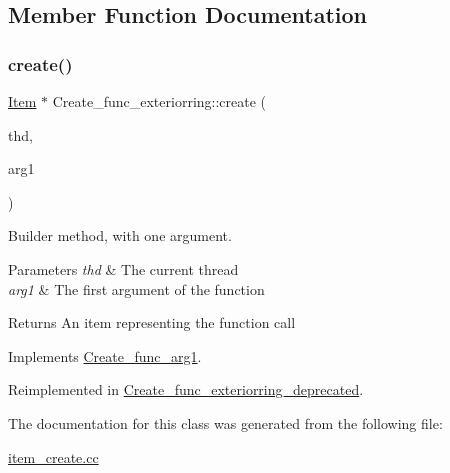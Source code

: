 \subsection{Member Function Documentation}
\mbox{\label{classCreate__func__exteriorring_a5c826151baad6fc0e554c5faacbc552a}} 
\subsubsection{\texorpdfstring{create()}{create()}}
{\footnotesize\ttfamily \mbox{\hyperlink{classItem}{Item}} $\ast$ Create\+\_\+func\+\_\+exteriorring\+::create (\begin{DoxyParamCaption}\item[{T\+HD $\ast$}]{thd,  }\item[{\mbox{\hyperlink{classItem}{Item}} $\ast$}]{arg1 }\end{DoxyParamCaption})\hspace{0.3cm}{\ttfamily [virtual]}}

Builder method, with one argument. 
\begin{DoxyParams}{Parameters}
{\em thd} & The current thread \\
\hline
{\em arg1} & The first argument of the function \\
\hline
\end{DoxyParams}
\begin{DoxyReturn}{Returns}
An item representing the function call 
\end{DoxyReturn}


Implements \mbox{\hyperlink{classCreate__func__arg1_a3e9a98f755cd82c3e762e334c955a8c9}{Create\+\_\+func\+\_\+arg1}}.



Reimplemented in \mbox{\hyperlink{classCreate__func__exteriorring__deprecated_afec0600433348b5b76dec6b08d320a46}{Create\+\_\+func\+\_\+exteriorring\+\_\+deprecated}}.



The documentation for this class was generated from the following file\+:\begin{DoxyCompactItemize}
\item 
\mbox{\hyperlink{item__create_8cc}{item\+\_\+create.\+cc}}\end{DoxyCompactItemize}
